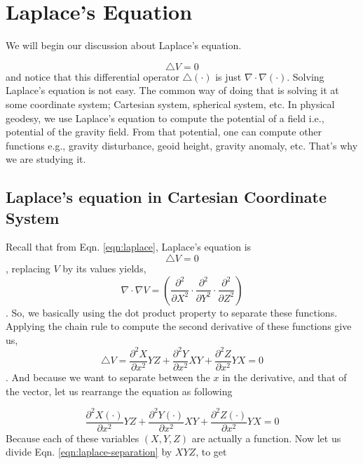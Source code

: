 \documentclass{tufte-book}
\begin{document}
\chapter{Laplace's Equation}
We will begin our discussion about Laplace's equation. 

\begin{equation}
	\label{eqn:laplace}
	\triangle V = 0
\end{equation}
and notice that this differential operator $\triangle(\cdot)$ is just \(\nabla\cdot\nabla(\cdot)\). Solving Laplace's equation is not easy. The common way of doing that is solving it at some coordinate system; Cartesian system, spherical system, etc. In physical geodesy, we use Laplace's equation to compute the potential of a field i.e., potential of the gravity field. From that potential, one can compute other functions e.g., gravity disturbance, geoid height, gravity anomaly, etc. That's why we are studying it.

\section{Laplace's equation in Cartesian Coordinate System}

Recall that from Eqn. \eqref{eqn:laplace}, Laplace's equation is
\begin{equation*}
\triangle V = 0
\end{equation*}, replacing $V$ by its values yields,
\begin{equation*}
\nabla \cdot \nabla V = \left(\frac{\partial^2}{\partial X^2}\cdot\frac{\partial^2}{\partial Y^2}\cdot\frac{\partial^2}{\partial Z^2}\right)
\end{equation*}. So, we basically using the dot product property to separate these functions. Applying the chain rule to compute the second derivative of these functions give us,
\begin{equation}
\label{eqn:chain-rule-laplace}
\triangle V = \frac{\partial^2 X}{\partial x^2} YZ + \frac{\partial^2 Y}{\partial x^2} XY + \frac{\partial^2 Z}{\partial x^2} YX = 0
\end{equation}. 
And because we want to separate between the $x$ in the derivative, and that of the vector, let us rearrange the equation as following

\begin{equation}
	\label{eqn:laplace-separation}
	\frac{\partial^2 X(\cdot)}{\partial x^2} YZ + \frac{\partial^2 Y(\cdot)}{\partial x^2} XY + \frac{\partial^2 Z(\cdot)}{\partial x^2} YX = 0
\end{equation}
Because each of these variables $(X, Y, Z)$ are actually a function. Now let us divide Eqn. \eqref{eqn:laplace-separation} by \(XYZ\), to get
\end{document}
